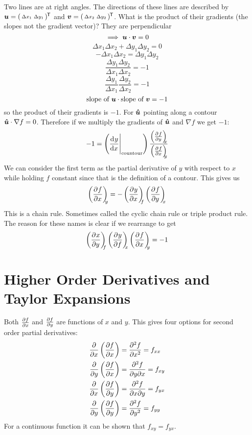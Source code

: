 \documentclass{article}
\renewcommand{\grad}{\nabla}
\begin{document}
    Two lines are at right angles.
    The directions of these lines are described by \(\bm{u} = (\begin{smallmatrix} \Delta x_1 & \Delta y_1 \end{smallmatrix})^{\mkern-1.5mu\mathsf{T}}\) and \(\bm{v} = (\begin{smallmatrix} \Delta x_2 & \Delta y_2 \end{smallmatrix})^{\mkern-1.5mu\mathsf{T}}\).
    What is the product of their gradients (the slopes not the gradient vector)?
    They are perpendicular
    \[\implies \bm{u}\cdot \bm{v} = 0\]
    \[\Delta x_1\Delta x_2 + \Delta y_1\Delta y_2 = 0\]
    \[-\Delta x_1\Delta x_2 = \Delta y_1\Delta y_2\]
    \[\frac{\Delta y_1\Delta y_2}{\Delta x_1\Delta x_2} = -1\]
    \[\frac{\Delta y_1}{\Delta x_1}\frac{\Delta y_2}{\Delta x_2} = -1\]
    \[\text{slope of }\bm{u}\cdot \text{slope of }\bm{v} = -1\]
    so the product of their gradients is \(-1\).
    For \(\bm{\hat{u}}\) pointing along a contour \(\vh u\cdot \grad f = 0\).
    Therefore if we multiply the gradients of \(\bm{\hat{u}}\) and \(\grad f\) we get \(-1\):
    \[-1 = \left(\dv[]{y}{x}\Biggr|_{\text{countour}}\right)\frac{\left(\pdv[]{f}{y}\right)_{\!\!\!{x}}}{\left(\pdv[]{f}{x}\right)_{\!\!\!{y}}}\]
    We can consider the first term as the partial derivative of \(y\) with respect to \(x\) while holding \(f\) constant since that is the definition of a contour. 
    This gives us
    \[\pdvconst{f}{x}{y} = -\pdvconst{y}{x}{f}\pdvconst{f}{y}{x}\]
    This is a chain rule. Sometimes called the cyclic chain rule or triple product rule.
    The reason for these names is clear if we rearrange to get
    \[\pdvconst{x}{y}{f}\pdvconst{y}{f}{x}\pdvconst{f}{x}{y} = -1\]

    \section{Higher Order Derivatives and Taylor Expansions}
    Both \(\pdv{f}{x}\) and \(\pdv{f}{y}\) are functions of \(x\) and \(y\).
    This gives four options for second order partial derivatives:
    \begin{align*}
        \pdv{x}\left(\pdv{f}{x}\right) &= \pdv[2]{f}{x} = f_{xx}\\
        \pdv{y}\left(\pdv{f}{x}\right) &= \frac{\partial^2{f}}{\partial{y}\partial{x}} = f_{xy}\\
        \pdv{x}\left(\pdv{f}{y}\right) &= \frac{\partial^2{f}}{\partial{x}\partial{y}} = f_{yx}\\
        \pdv{y}\left(\pdv{f}{y}\right) &= \pdv[2]{f}{y} = f_{yy}\\
    \end{align*}
    For a continuous function it can be shown that \(f_{xy} = f_{yx}\).
    
\end{document}
